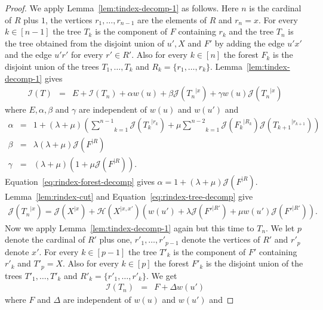 \documentclass[11 pt]{modarticle}
\newcommand{\wmap}{w}
\newcommand{\rtree}[2]{{#1}^{\lvert #2}}
\newcommand{\indexsymbol}{\mathcal{I}}
\newcommand{\tindex}[1]{\indexsymbol(#1)}
\newcommand{\rindexsymbol}{\mathcal{J}}
\newcommand{\rindex}[2]{\rindexsymbol(\rtree{#2}{#1})}
\newcommand{\aindexsymbol}{\mathcal{H}}
\newcommand{\aindex}[3]{\aindexsymbol(\rtree{#3}{#1, #2})}
\begin{document}
\begin{proof}
We apply Lemma~\ref{lem:tindex-decomp-1} as follows. Here $n$ is the cardinal of $R$ plus $1$, the vertices $r_1, \dots, r_{n-1}$ are the elements of $R$ and $r_n = x$. For every $k \in [n-1]$ the tree $T_k$ is the component of $F$ containing $r_k$ and the tree $T_n$ is the tree obtained from the disjoint union of $u', X$ and $F'$ by adding the edge $u'x'$ and the edge $u' r'$ for every $r' \in R'$. Also for every $k \in [n]$ the forest $F_k$ is the disjoint union of the trees $T_1, \dots, T_k$ and $R_k = \{r_1, \dots, r_k\}$. Lemma~\ref{lem:tindex-decomp-1} gives
\begin{eqnarray}
	\tindex{T} & = & E + \tindex{T_n} + \alpha \wmap(u) + \beta \rindex{x}{T_n} + \gamma \wmap(u) \rindex{x}{T_n} \label{eq:tindex-decomp-proof-eq1}
\end{eqnarray}
where $E, \alpha, \beta$ and $\gamma$ are independent of $\wmap(u)$ and $\wmap(u')$ and
\begin{eqnarray*}
	\alpha & = & 1 + (\lambda + \mu) \left(\underset{k=1}{\overset{n-1}{\sum}} \rindex{r_k}{T_k} + \mu \underset{k=1}{\overset{n-2}{\sum}} \rindex{R_k}{F_k}\rindex{r_{k+1}}{T_{k+1}}\right) \\
	\beta & = & \lambda (\lambda + \mu)\rindex{R}{F} \\
	\gamma & = & (\lambda + \mu) (1 + \mu \rindex{R}{F}).
\end{eqnarray*}
Equation~\eqref{eq:rindex-forest-decomp} gives $\alpha = 1 + (\lambda + \mu) \rindex{R}{F}$. Lemma~\ref{lem:rindex-cut} and Equation~\eqref{eq:rindex-tree-decomp} give
\begin{eqnarray}
	\rindex{x}{T_n} = \rindex{x}{X} + \aindex{x}{x'}{X}\left(\wmap(u') + \lambda \rindex{R'}{F'} + \mu \wmap(u') \rindex{R'}{F'}\right). \label{eq:tindex-decomp-proof-eq2}
\end{eqnarray}
Now we apply Lemma~\ref{lem:tindex-decomp-1} again but this time to $T_n$. We let $p$ denote the cardinal of $R'$ plus one, $r'_1, \dots, r'_{p-1}$ denote the vertices of $R'$ and $r'_p$ denote $x'$. For every $k \in [p-1]$ the tree $T'_k$ is the component of $F'$ containing $r'_k$ and $T'_p = X$. Also for every $k \in [p]$ the forest $F'_k$ is the disjoint union of the trees $T'_1, \dots, T'_k$ and $R'_k = \{r'_1, \dots, r'_k\}$. We get
\begin{eqnarray}
	\tindex{T_n} & = & F + \Delta \wmap(u') \label{eq:tindex-decomp-proof-eq3}
\end{eqnarray}
where $F$ and $\Delta$ are independent of $\wmap(u)$ and $\wmap(u')$ and

\end{proof}
\end{document}
